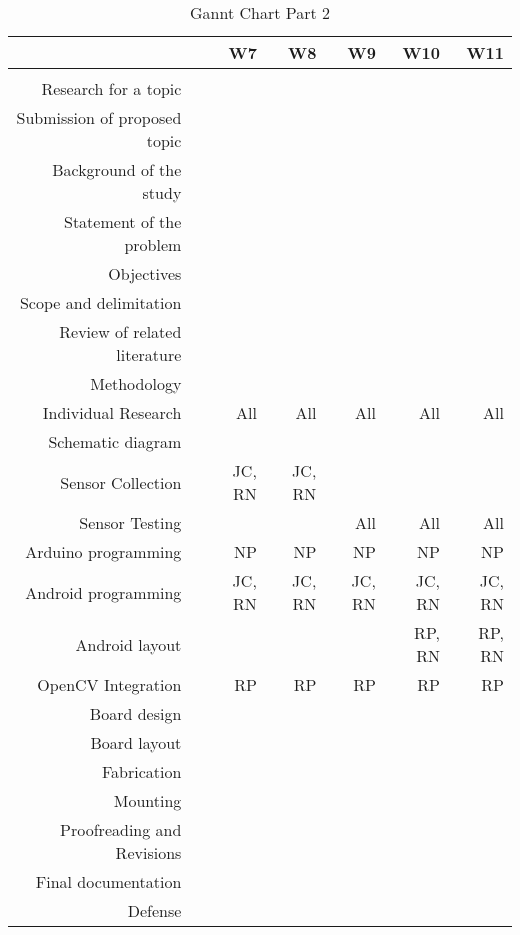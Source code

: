 \begin{table}[htbp]
  \centering
  \caption{Gannt Chart Part 2}
    \begin{tabular}{rrrrrrr}
    \toprule
      &   & W7 & W8 & W9 & W10 & W11 \\
    \midrule
      &   &   &   &   &   &  \\
    Research for a topic &   &   &   &   &   &  \\
    Submission of proposed topic &   &   &   &   &   &  \\
    Background of the study &   &   &   &   &   &  \\
    Statement of the problem &   &   &   &   &   &  \\
    Objectives &   &   &   &   &   &  \\
    Scope and delimitation &   &   &   &   &   &  \\
    Review of related literature &   &   &   &   &   &  \\
    Methodology &   &   &   &   &   &  \\
    Individual Research &   & All & All & All & All & All \\
    Schematic diagram &   &   &   &   &   &  \\
    Sensor Collection &   & JC, RN & JC, RN &   &   &  \\
    Sensor Testing &   &   &   & All & All & All \\
    Arduino programming &   & NP & NP & NP & NP & NP \\
    Android programming &   & JC, RN & JC, RN & JC, RN & JC, RN & JC, RN \\
    Android layout &   &   &   &   & RP, RN & RP, RN \\
    OpenCV Integration &   & RP & RP & RP & RP & RP \\
    Board design &   &   &   &   &   &  \\
    Board layout &   &   &   &   &   &  \\
    Fabrication &   &   &   &   &   &  \\
    Mounting &   &   &   &   &   &  \\
    Proofreading and Revisions &   &   &   &   &   &  \\
    Final documentation &   &   &   &   &   &  \\
    Defense &   &   &   &   &   &  \\
    \bottomrule
    \end{tabular}%
  \label{tab:addlabel}%
\end{table}%


